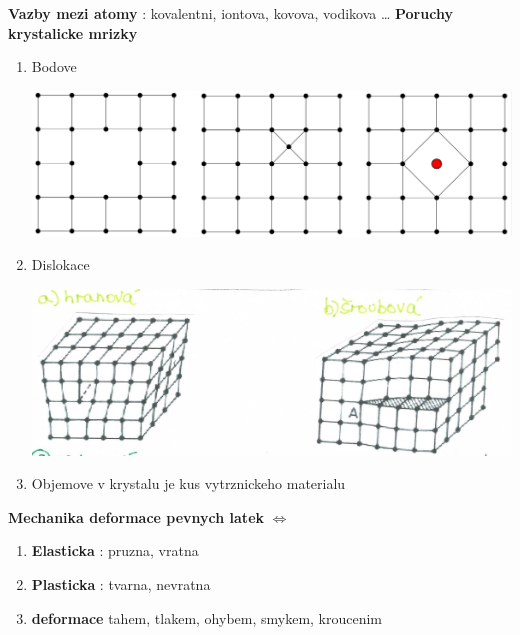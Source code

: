 \documentclass{report}
\begin{document}
\textbf{Vazby mezi atomy} : kovalentni, iontova, kovova, vodikova \ldots
\textbf{Poruchy krystalicke mrizky} 
\begin{enumerate}[label=\bfseries\tiny\protect\circled{\small\arabic*}]
  \item Bodove
    \begin{center}
      \includegraphics[width=0.6\linewidth]{images/bodove.png}
    \end{center}%
  \item Dislokace
    \begin{center}
      \includegraphics[width=0.6\linewidth]{images/dislokace.png}
    \end{center}%
  \item Objemove v krystalu je kus vytrznickeho materialu
\end{enumerate}
\textbf{Mechanika deformace pevnych latek}
$\iff$
\begin{enumerate}[label=\bfseries\tiny\protect\circled{\small\arabic*}]
  \item \textbf{Elasticka} : pruzna, vratna
  \item \textbf{Plasticka}  : tvarna, nevratna
  \item \textbf{deformace} tahem, tlakem, ohybem, smykem, kroucenim
\end{enumerate}
\end{document}
